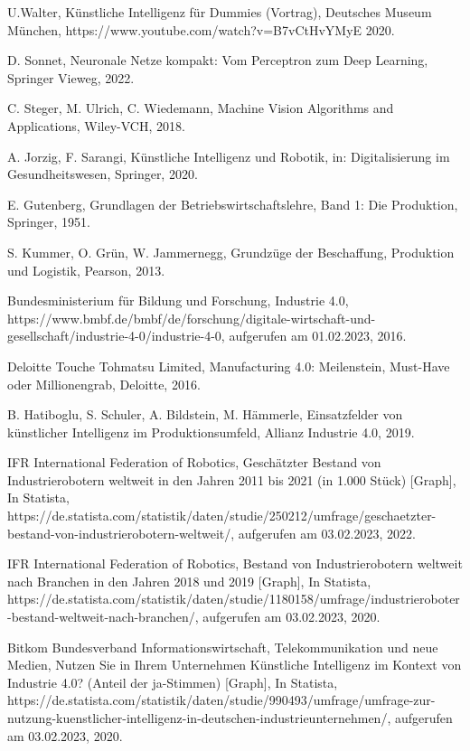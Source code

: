 \begin{thebibliography}{99}
	U.Walter,
	Künstliche Intelligenz für Dummies (Vortrag),
	Deutsches Museum München,
	https://www.youtube.com/watch?v=B7vCtHvYMyE
	2020.

	D. Sonnet,
	Neuronale Netze kompakt: Vom Perceptron zum Deep Learning,
	Springer Vieweg,
	2022.

	C. Steger, M. Ulrich, C. Wiedemann,
	Machine Vision Algorithms and Applications,
	Wiley-VCH,
	2018.

	A. Jorzig, F. Sarangi,
	Künstliche Intelligenz und Robotik, 
	in: Digitalisierung im Gesundheitswesen,
	Springer,
	2020.

	E. Gutenberg,
	Grundlagen der Betriebswirtschaftslehre, Band 1: Die Produktion,
	Springer,
	1951.

	S. Kummer, O. Grün, W. Jammernegg,
	Grundzüge der Beschaffung, Produktion und Logistik,
	Pearson,
	2013.

	Bundesministerium für Bildung und Forschung,
	Industrie 4.0,
	https://www.bmbf.de/bmbf/de/forschung/digitale-wirtschaft-und-gesellschaft/industrie-4-0/industrie-4-0,
	aufgerufen am 01.02.2023,
	2016.

	Deloitte Touche Tohmatsu Limited,
	Manufacturing 4.0: Meilenstein, Must-Have oder Millionengrab,
	Deloitte,
	2016.

	B. Hatiboglu, S. Schuler, A. Bildstein, M. Hämmerle, 
	Einsatzfelder von künstlicher Intelligenz im Produktionsumfeld,
	Allianz Industrie 4.0, 
	2019.

	IFR International Federation of Robotics,
	Geschätzter Bestand von Industrierobotern weltweit in den Jahren 2011 bis 2021 (in 1.000 Stück) [Graph],
	In Statista,
	https://de.statista.com/statistik/daten/studie/250212/umfrage/geschaetzter-bestand-von-industrierobotern-weltweit/,
	aufgerufen am 03.02.2023,
	2022.

	IFR International Federation of Robotics,
	Bestand von Industrierobotern weltweit nach Branchen in den Jahren 2018 und 2019 [Graph],
	In Statista,
	https://de.statista.com/statistik/daten/studie/1180158/umfrage/industrieroboter-bestand-weltweit-nach-branchen/,
	aufgerufen am 03.02.2023,
	2020.

	Bitkom Bundesverband Informationswirtschaft, Telekommunikation und neue Medien,
	Nutzen Sie in Ihrem Unternehmen Künstliche Intelligenz im Kontext von Industrie 4.0? (Anteil der ja-Stimmen) [Graph],
	In Statista,
	https://de.statista.com/statistik/daten/studie/990493/umfrage/umfrage-zur-nutzung-kuenstlicher-intelligenz-in-deutschen-industrieunternehmen/,
	aufgerufen am 03.02.2023,
	2020.


\end{thebibliography}
